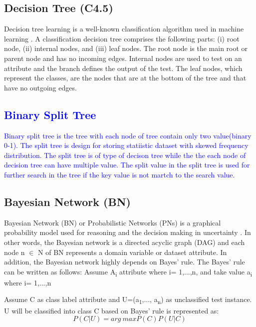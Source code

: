 \documentclass[review]{elsarticle}
\begin{document}
\subsection{Decision Tree (C4.5)}
\label{subsec:DT}
Decision tree learning is a well-known classification algorithm used in machine learning \cite{Quinlan1986}. A classification decision tree comprises the following parts: (i) root node, (ii) internal nodes, and (iii) leaf nodes. The root node is the main root or parent node and has no incoming edges. Internal nodes are used to test on an attribute and the branch defines the output of the test. The leaf nodes, which represent the classes, are the nodes that are at the bottom of the tree and that have no outgoing edges.
\textcolor{blue}{
\subsection{Binary Split Tree}
\label{subsec:BST}
Binary split tree is the tree with each node of tree contain only two value(binary 0-1). The split tree is design for storing statiistic dataset with skewed frequency distribution. The split tree is of type of decison tree while the the each node of decision tree can have multiple value. The split value in the split tree is used for further search in
the tree if the key value is not martch to the search value.  
}

\subsection{Bayesian Network (BN)}
\label{subsec:BN}
Bayesian Network (BN) or Probabilistic Networks (PNs) is a graphical probability model used for reasoning and the decision making in uncertainty \cite{Friedman1998}. In other words, the Bayesian network is a directed acyclic graph (DAG) and each node n $\in$ N of BN represents a domain variable or dataset attribute. In addition, the Bayesian network highly depends on Bayes’ rule. The Bayes' rule can be written as follows: 
 	Assume A\textsubscript{i}  attribute where i= 1,...,n, and take value a\textsubscript{i}  where i= 1,...,n
 	
Assume C as class label attribute and U=(a\textsubscript{1},..., a\textsubscript{n}) as unclassified test instance. U will be classified into class C based on Bayes’ rule is represented as:
 	\begin{equation}
 	P(C|U)=arg\ max P(C)P(U|C)
 	\label{eq:BN}
 	\end{equation}
 	
\end{document}

